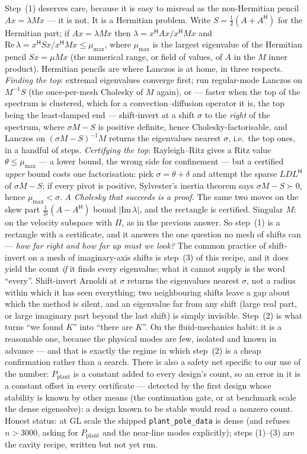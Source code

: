 \documentclass[11pt,a4paper]{article}
\newcommand{\code}[1]{\texttt{#1}}
\newcommand{\hp}{^{\mathsf H}}
\begin{document}
{Step~(1) deserves care, because it is easy to misread as the non-Hermitian pencil
$Ax=\lambda Mx$ --- it is not.  It is a Hermitian problem.
Write $S=\tfrac12(A+A\hp)$ for the Hermitian part; if $Ax=\lambda Mx$ then
$\lambda=x\hp Ax/x\hp Mx$ and
$\mathrm{Re}\,\lambda=x\hp Sx/x\hp Mx\le\mu_{\max}$, where $\mu_{\max}$ is the largest
eigenvalue of the Hermitian pencil $Sx=\mu Mx$ (the numerical range, or field of values,
of $A$ in the $M$ inner product).  Hermitian pencils are where Lanczos is at home, in
three respects.  \emph{Finding the top}: extremal eigenvalues converge first; run
regular-mode Lanczos on $M^{-1}S$ (the once-per-mesh Cholesky of $M$ again), or ---
faster when the top of the spectrum is clustered, which for a convection--diffusion
operator it is, the top being the least-damped end --- shift-invert at a shift $\sigma$
to the \emph{right} of the spectrum, where $\sigma M-S$ is positive definite, hence
Cholesky-factorisable, and Lanczos on $(\sigma M-S)^{-1}M$ returns the eigenvalues
nearest $\sigma$, i.e.\ the top ones, in a handful of steps.  \emph{Certifying the top}:
Rayleigh--Ritz gives a Ritz value $\theta\le\mu_{\max}$ --- a lower bound, the wrong side
for confinement --- but a certified \emph{upper} bound costs one factorisation: pick
$\sigma=\theta+\delta$ and attempt the sparse $LDL\hp$ of $\sigma M-S$; if every pivot is
positive, Sylvester's inertia theorem says $\sigma M-S\succ0$, hence $\mu_{\max}<\sigma$.
\emph{A Cholesky that succeeds is a proof.}  The same two moves on the skew part
$\tfrac1{2i}(A-A\hp)$ bound $|\mathrm{Im}\,\lambda|$, and the rectangle is certified.
Singular $M$: on the velocity subspace with $\Pi$, as in the previous answer.
So step~(1) is a rectangle with a certificate, and it answers the one question no mesh of
shifts can --- \emph{how far right and how far up must we look?}  The common practice of
shift-invert on a mesh of imaginary-axis shifts is step~(3) of this recipe, and it does
yield the count \emph{if} it finds every eigenvalue; what it cannot supply is the word
``every''.  Shift-invert Arnoldi at
$\sigma$ returns the eigenvalues nearest $\sigma$, not a radius within which it has seen
everything; two neighbouring shifts leave a gap about which the method is silent, and an
eigenvalue far from any shift (large real part, or large imaginary part beyond the last
shift) is simply invisible.  Step~(2) is what turns ``we found $K$'' into ``there are
$K$''.  On the fluid-mechanics habit: it is a reasonable one, because the physical modes
are few, isolated and known in advance --- and that is exactly the regime in which
step~(2) is a cheap confirmation rather than a search.  There is also a safety net
specific to our use of the number: $P_{\mathrm{plant}}$ is a constant added to every
design's count, so an error in it is a constant offset in every certificate --- detected
by the first design whose stability is known by other means (the continuation gate, or at
benchmark scale the dense eigensolve): a design known to be stable would read a nonzero
count.  Honest status: at GL scale the shipped \code{plant\_pole\_data} is dense (and
refuses $n>3000$, asking for $P_{\mathrm{plant}}$ and the near-line modes explicitly);
steps (1)--(3) are the cavity recipe, written but not yet run.

}
\end{document}
